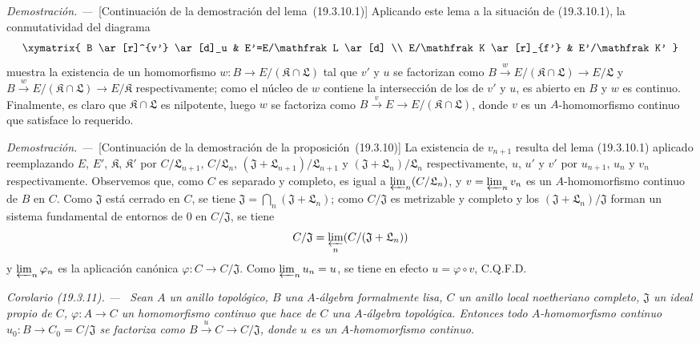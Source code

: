 \documentclass[10pt,oneside]{book}
\makeatletter
\newcommand{\setmanualcurrentlabel}[1]{\def\@currentlabel{#1}}
\newenvironment{corollary}[1][]{%
  \setmanualcurrentlabel{#1}\par\medskip\noindent\itshape Corolario (#1). ---\ }{\par}
\newenvironment{proof}{%
  \par\medskip\noindent\textit{Demostración. ---\ }}{\par}
\makeatother
\begin{document}
\begin{proof}[Continuación de la demostración del lema~{\rm(19.3.10.1)}]
Aplicando este lema a la situación de (19.3.10.1), la conmutatividad del
diagrama
\[
\xymatrix{
  B \ar[r]^{v'} \ar[d]_u & E'=E/\mathfrak L \ar[d] \\
  E/\mathfrak K \ar[r]_{f'} & E'/\mathfrak K'
}
\]
muestra la existencia de un homomorfismo
$w:B\to E/(\mathfrak K\cap\mathfrak L)$ tal que $v'$ y $u$ se
factorizan como
$B\xrightarrow{w}E/(\mathfrak K\cap\mathfrak L)\to E/\mathfrak L$
y
$B\xrightarrow{w}E/(\mathfrak K\cap\mathfrak L)\to E/\mathfrak K$
respectivamente; como el núcleo de $w$ contiene la intersección de los de
$v'$ y $u$, es abierto en $B$ y $w$ es continuo. Finalmente, es claro
que $\mathfrak K\cap\mathfrak L$ es nilpotente, luego $w$ se factoriza como
$B\xrightarrow{v}E\to E/(\mathfrak K\cap\mathfrak L)$, donde $v$ es
un $A$-homomorfismo continuo que satisface lo requerido.
\end{proof}

\begin{proof}[Continuación de la demostración de la proposición~{\rm(19.3.10)}]
La existencia de $v_{n+1}$ resulta del lema (19.3.10.1) aplicado reemplazando
$E$, $E'$, $\mathfrak K$, $\mathfrak K'$ por
$C/\mathfrak L_{n+1}$, $C/\mathfrak L_n$,
$(\mathfrak J+\mathfrak L_{n+1})/\mathfrak L_{n+1}$ y
$(\mathfrak J+\mathfrak L_n)/\mathfrak L_n$ respectivamente, $u$, $u'$
y $v'$ por $u_{n+1}$, $u_n$ y $v_n$ respectivamente. Observemos que, como $C$
es separado y completo, es igual a $\varprojlim_n(C/\mathfrak L_n)$, y
$v=\varprojlim_n v_n$ es un $A$-homomorfismo continuo de $B$ en $C$.
Como $\mathfrak J$ está cerrado en $C$, se tiene
$\mathfrak J=\bigcap_n(\mathfrak J+\mathfrak L_n)$; como
$C/\mathfrak J$ es metrizable y completo y los
$(\mathfrak J+\mathfrak L_n)/\mathfrak J$ forman un sistema fundamental
de entornos de $0$ en $C/\mathfrak J$, se tiene
\[
  C/\mathfrak J=\varprojlim_n(C/(\mathfrak J+\mathfrak L_n))
\]
y $\varprojlim_n\varphi_n$ es la aplicación canónica
$\varphi:C\to C/\mathfrak J$. Como $\varprojlim_n u_n=u$, se tiene en efecto
$u=\varphi\circ v$, C.Q.F.D.
\end{proof}

\begin{corollary}[19.3.11]
\label{0.19.3.11-es}
Sean $A$ un anillo topológico, $B$ una $A$-álgebra formalmente lisa,
$C$ un anillo local noetheriano completo, $\mathfrak J$ un ideal propio de
$C$, $\varphi:A\to C$ un homomorfismo continuo que hace de $C$ una
$A$-álgebra topológica. Entonces todo $A$-homomorfismo continuo
$u_0:B\to C_0=C/\mathfrak J$ se factoriza como
$B\xrightarrow{u}C\to C/\mathfrak J$, donde $u$ es un $A$-homomorfismo
continuo.
\end{corollary}
\end{document}
